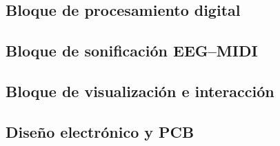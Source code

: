 \documentclass[../main.tex]{subfiles}
\begin{document}

\subsection{Bloque de procesamiento digital}


\subsection{Bloque de sonificación EEG--MIDI}


\subsection{Bloque de visualización e interacción}


\subsection{Diseño electrónico y PCB}

\end{document}
